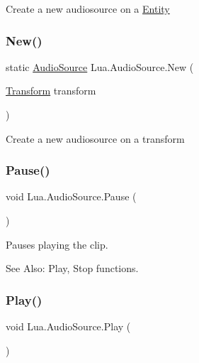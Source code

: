Create a new audiosource on a \mbox{\hyperlink{class_lua_1_1_entity}{Entity}} 

\mbox{\label{class_lua_1_1_audio_source_a6b5a139f410004dd985f118c90dd5179}} 
\subsubsection{\texorpdfstring{New()}{New()}\hspace{0.1cm}{\footnotesize\ttfamily [2/2]}}
{\footnotesize\ttfamily static \mbox{\hyperlink{class_lua_1_1_audio_source}{Audio\+Source}} Lua.\+Audio\+Source.\+New (\begin{DoxyParamCaption}\item[{\mbox{\hyperlink{class_lua_1_1_transform}{Transform}}}]{transform }\end{DoxyParamCaption})\hspace{0.3cm}{\ttfamily [static]}}



Create a new audiosource on a transform 

\mbox{\label{class_lua_1_1_audio_source_aad8aea6c6f265dfe440a6a8620416bf4}} 
\subsubsection{\texorpdfstring{Pause()}{Pause()}}
{\footnotesize\ttfamily void Lua.\+Audio\+Source.\+Pause (\begin{DoxyParamCaption}{ }\end{DoxyParamCaption})}



Pauses playing the clip. 

See Also\+: Play, Stop functions. \mbox{\label{class_lua_1_1_audio_source_aef1a519a4611e2aa72570d113d92c904}} 
\subsubsection{\texorpdfstring{Play()}{Play()}}
{\footnotesize\ttfamily void Lua.\+Audio\+Source.\+Play (\begin{DoxyParamCaption}{ }\end{DoxyParamCaption})}



